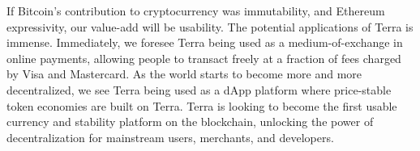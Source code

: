 \documentclass{article}
\begin{document}
If Bitcoin's contribution to cryptocurrency was immutability, and Ethereum expressivity, our value-add will be usability. The potential applications of Terra is immense. Immediately, we foresee Terra being used as a medium-of-exchange in online payments, allowing people to transact freely at a fraction of fees charged by Visa and Mastercard. As the world starts to become more and more decentralized, we see Terra being used as a dApp platform where price-stable token economies are built on Terra. Terra is looking to become the first usable currency and stability platform on the blockchain, unlocking the power of decentralization for mainstream users, merchants, and developers.


% 
% 

\end{document}
